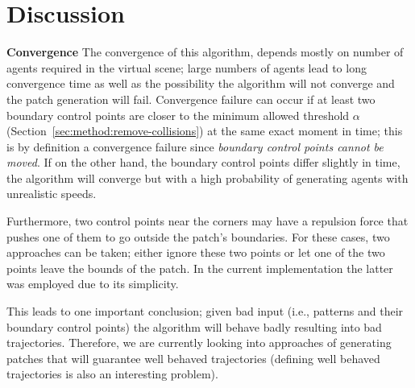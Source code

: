 \section{Discussion}
\label{sec:discussion}

\textbf{Convergence}
The convergence of this algorithm, depends mostly on number of agents required in the virtual scene; large numbers of agents lead to long convergence time as well as the possibility the algorithm will not converge and the patch generation will fail.
Convergence failure can occur if at least two boundary control points are closer to the minimum allowed threshold $\alpha$ (Section~\ref{sec:method:remove-collisions}) at the same exact moment in time; this is by definition a convergence failure since \emph{boundary control points cannot be moved}.
If on the other hand, the boundary control points differ slightly in time, the algorithm will converge but with a high probability of generating agents with unrealistic speeds.

% 

 Furthermore, two control points near the corners may have a repulsion force that pushes one of them to go outside the patch's boundaries.
For these cases, two approaches can be taken; either ignore these two points or let one of the two points leave the bounds of the patch.
In the current implementation the latter was employed due to its simplicity.
 
 This leads to one important conclusion; given bad input (i.e., patterns and their boundary control points) the algorithm will behave badly resulting into bad trajectories.
 Therefore, we are currently looking into approaches of generating patches that will guarantee well behaved trajectories (defining well behaved trajectories is also an interesting problem).


